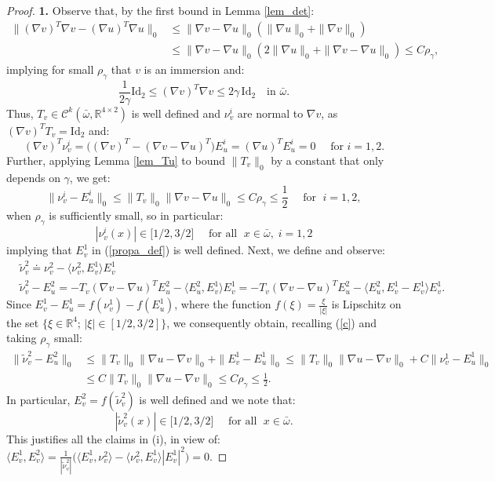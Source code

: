 \documentclass[10pt,a4paper]{amsart}
\newcommand{\Id}{\mathrm{Id}}
\newcommand{\R}{\mathbb{R}}
\begin{document}
\begin{proof}
{\bf 1.} Observe that, by the first bound in Lemma \ref{lem_det}:
\begin{equation*}
\begin{split}
\|(\nabla v)^T\nabla v - (\nabla u)^T\nabla u\|_0& \leq \|\nabla
v-\nabla u\|_0(\|\nabla u\|_0+\|\nabla v\|_0) \\ & \leq \|\nabla
v-\nabla u\|_0 (2\|\nabla u\|_0+\|\nabla v-\nabla u\|_0) \leq C \rho_\gamma,
\end{split}
\end{equation*}
implying for small $\rho_\gamma$ that $v$ is an immersion and:
\begin{equation}\label{a}
\frac{1}{2\gamma}\Id_2\leq (\nabla v)^T\nabla v\leq 2\gamma \,\Id_2
\quad\mbox{in } \bar\omega.
\end{equation}
Thus, $T_v\in \mathcal{C}^{k}(\bar\omega, \R^{4\times 2})$
is well defined and $\nu_v^i$ are normal to $\nabla v$, as $(\nabla v)^TT_v=\Id_2$ and:
$$(\nabla v)^T\nu_v^i = \big((\nabla v)^T - (\nabla v-\nabla
u)^T\big)E^i_u=(\nabla u)^TE^i_u=0 \quad\mbox{ for } i=1,2.$$
Further, applying Lemma \ref{lem_Tu} to bound $\|T_v\|_0$ by a
constant that only depends on $\gamma$, we get:
\begin{equation}\label{c}
 \|\nu_v^i- E^i_u\|_0\leq  \|T_v\|_0\|\nabla v-\nabla u\|_0\leq C
\rho_\gamma\leq \frac{1}{2} \quad \mbox{ for }\; i=1,2,
\end{equation}
when $\rho_\gamma$ is sufficiently small, so in particular:
$$ |\nu_v^i(x)|\in \big[{1}/{2}, {3}/{2}\big]\quad 
\mbox{ for all } \; x\in\bar\omega, \;  i=1,2$$
implying that $E^1_v$ in (\ref{propa_def}) is well defined. Next, we define and observe:
\begin{equation}\label{jad}
\begin{split}
&\tilde\nu^2_v\doteq \nu_v^2-\langle \nu_v^2, E_v^1\rangle E_v^1\\
& \tilde\nu^2_v- E_u^2 =- T_v(\nabla v-\nabla u)^TE_u^2 -
\langle E_u^2, E_v^1\rangle E_v^1 = - T_v(\nabla v-\nabla u)^TE_u^2 -
\langle E_u^2, E_v^1-E^1_v\rangle E_v^1.
\end{split}
\end{equation}
Since $E_v^1-E_u^1=f(\nu_v^1)- f(E_u^1)$, where the function $f(\xi) = \frac{\xi}{|\xi|}$ is Lipschitz on the
set $\{\xi\in\R^4;\,|\xi|\in [1/2, 3/2]\}$, we consequently obtain, recalling
(\ref{c}) and taking $\rho_\gamma$ small:
\begin{equation*}
\begin{split}
\|\tilde\nu_v^2-E_u^2\|_0&\leq \|T_v\|_0\|\nabla u-\nabla v\|_0 +
\|E_v^1-E_u^1\|_0\leq \|T_v\|_0\|\nabla u-\nabla v\|_0 +
C\|\nu_v^1-E_u^1\|_0 \\ & \leq C \|T_v\|_0\|\nabla u-\nabla v\|_0\leq
C\rho_\gamma\leq \frac{1}{2}.
\end{split}
\end{equation*}
In particular, $E^2_v=f(\tilde \nu^2_v)$ is well defined and we note that:
$$ |\tilde \nu_v^2(x)|\in \big[{1}/{2}, {3}/{2}\big]\quad 
\mbox{ for all } \; x\in\bar\omega.$$
This justifies all the claims in (i), in view of:
$\langle E_v^1, E_v^2\rangle = \frac{1}{|\tilde \nu^2_v|}\big(\langle E_v^1, \nu_v^2\rangle -
  \langle \nu_v^2, E_v^1\rangle |E^1_v|^2\big)=0.$


\end{proof}
\end{document}
